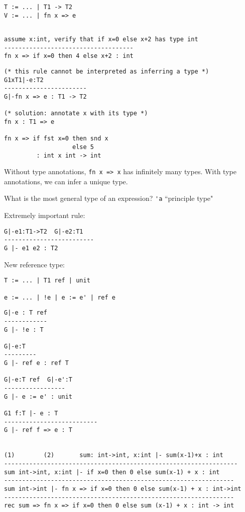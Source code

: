 \documentclass[11pt]{article}
\begin{document}
\begin{verbatim}
T := ... | T1 -> T2
V := ... | fn x => e
\end{verbatim}

\begin{verbatim}

assume x:int, verify that if x=0 else x+2 has type int
------------------------------------
fn x => if x=0 then 4 else x+2 : int
\end{verbatim}

\begin{verbatim}
(* this rule cannot be interpreted as inferring a type *)
G1xT1|-e:T2
-----------------------
G|-fn x => e : T1 -> T2

(* solution: annotate x with its type *)
fn x : T1 => e

fn x => if fst x=0 then snd x
                   else 5
         : int x int -> int
\end{verbatim}

Without type annotations, \verb~fn x => x~ has infinitely many types. With type annotations, we can infer a unique type.

What is the most general type of an expression? \verb~'a~ ``principle type"

Extremely important rule:
\begin{verbatim}
G|-e1:T1->T2  G|-e2:T1
-------------------------
G |- e1 e2 : T2
\end{verbatim}

New reference type:
\begin{verbatim}
T := ... | T1 ref | unit

e := ... | !e | e := e' | ref e
\end{verbatim}

\begin{verbatim}
G|-e : T ref
------------
G |- !e : T

G|-e:T
---------
G |- ref e : ref T

G|-e:T ref  G|-e':T
-----------------
G |- e := e' : unit

G1 f:T |- e : T
--------------------------
G |- ref f => e : T


(1)        (2)       sum: int->int, x:int |- sum(x-1)+x : int
-----------------------------------------------------------------
sum int->int, x:int |- if x=0 then 0 else sum(x-1) + x : int
----------------------------------------------------------------
sum int->int |- fn x => if x=0 then 0 else sum(x-1) + x : int->int
----------------------------------------------------------------
rec sum => fn x => if x=0 then 0 else sum (x-1) + x : int -> int
\end{verbatim}
\end{document}
